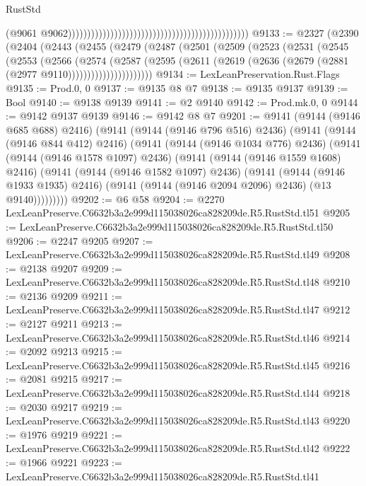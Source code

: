 \begin{lexlean}{RustStd}
\begin{coremodule}
                                                                                                (@9061
                                                                                                  @9062)))))))))))))))))))))))))))))))))))))))))))))))
@9133 := @2327
    (@2390
      (@2404
        (@2443
          (@2455
            (@2479
              (@2487
                (@2501
                  (@2509
                    (@2523
                      (@2531
                        (@2545
                          (@2553
                            (@2566
                              (@2574
                                (@2587
                                  (@2595
                                    (@2611
                                      (@2619 (@2636 (@2679 (@2881 (@2977 @9110))))))))))))))))))))))
@9134 := LexLeanPreservation.Rust.Flags
@9135 := Prod.{0, 0}
@9137 := @9135 @8 @7
@9138 := @9135 @9137
@9139 := Bool
@9140 := @9138 @9139
@9141 := @2 @9140
@9142 := Prod.mk.{0, 0}
@9144 := @9142 @9137 @9139
@9146 := @9142 @8 @7
@9201 := @9141
    (@9144 (@9146 @685 @688) @2416)
    (@9141
      (@9144 (@9146 @796 @516) @2436)
      (@9141
        (@9144 (@9146 @844 @412) @2416)
        (@9141
          (@9144 (@9146 @1034 @776) @2436)
          (@9141
            (@9144 (@9146 @1578 @1097) @2436)
            (@9141
              (@9144 (@9146 @1559 @1608) @2416)
              (@9141
                (@9144 (@9146 @1582 @1097) @2436)
                (@9141
                  (@9144 (@9146 @1933 @1935) @2416)
                  (@9141 (@9144 (@9146 @2094 @2096) @2436) (@13 @9140)))))))))
@9202 := @6 @58
@9204 := @2270 LexLeanPreserve.C6632b3a2e999d115038026ca828209de.R5.RustStd.tl51
@9205 := LexLeanPreserve.C6632b3a2e999d115038026ca828209de.R5.RustStd.tl50
@9206 := @2247 @9205
@9207 := LexLeanPreserve.C6632b3a2e999d115038026ca828209de.R5.RustStd.tl49
@9208 := @2138 @9207
@9209 := LexLeanPreserve.C6632b3a2e999d115038026ca828209de.R5.RustStd.tl48
@9210 := @2136 @9209
@9211 := LexLeanPreserve.C6632b3a2e999d115038026ca828209de.R5.RustStd.tl47
@9212 := @2127 @9211
@9213 := LexLeanPreserve.C6632b3a2e999d115038026ca828209de.R5.RustStd.tl46
@9214 := @2092 @9213
@9215 := LexLeanPreserve.C6632b3a2e999d115038026ca828209de.R5.RustStd.tl45
@9216 := @2081 @9215
@9217 := LexLeanPreserve.C6632b3a2e999d115038026ca828209de.R5.RustStd.tl44
@9218 := @2030 @9217
@9219 := LexLeanPreserve.C6632b3a2e999d115038026ca828209de.R5.RustStd.tl43
@9220 := @1976 @9219
@9221 := LexLeanPreserve.C6632b3a2e999d115038026ca828209de.R5.RustStd.tl42
@9222 := @1966 @9221
@9223 := LexLeanPreserve.C6632b3a2e999d115038026ca828209de.R5.RustStd.tl41

\end{coremodule}
\end{lexlean}
